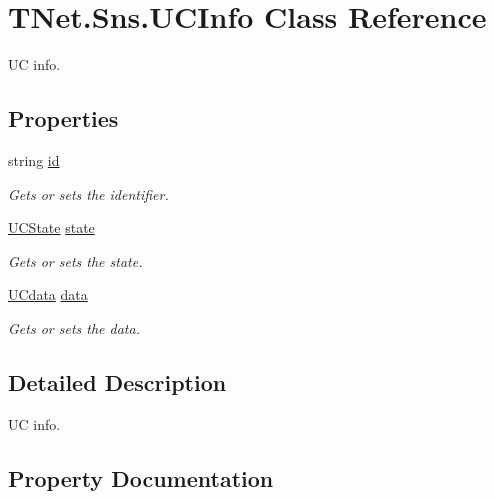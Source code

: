 \hypertarget{class_t_net_1_1_sns_1_1_u_c_info}{}\section{T\+Net.\+Sns.\+U\+C\+Info Class Reference}
\label{class_t_net_1_1_sns_1_1_u_c_info}


UC info.  


\subsection*{Properties}
\begin{DoxyCompactItemize}
\item 
string \mbox{\hyperlink{class_t_net_1_1_sns_1_1_u_c_info_a830b06eda6c267aacf0700dc9474a690}{id}}
\begin{DoxyCompactList}\small\item\em Gets or sets the identifier. \end{DoxyCompactList}\item 
\mbox{\hyperlink{class_t_net_1_1_sns_1_1_u_c_state}{U\+C\+State}} \mbox{\hyperlink{class_t_net_1_1_sns_1_1_u_c_info_a811c5e3ba364be5cee4498c1b291cc94}{state}}
\begin{DoxyCompactList}\small\item\em Gets or sets the state. \end{DoxyCompactList}\item 
\mbox{\hyperlink{class_t_net_1_1_sns_1_1_u_cdata}{U\+Cdata}} \mbox{\hyperlink{class_t_net_1_1_sns_1_1_u_c_info_af0a3636a2b9fbc6d32d46fb9281fdcdb}{data}}
\begin{DoxyCompactList}\small\item\em Gets or sets the data. \end{DoxyCompactList}\end{DoxyCompactItemize}


\subsection{Detailed Description}
UC info. 



\subsection{Property Documentation}
\mbox{\label{class_t_net_1_1_sns_1_1_u_c_info_af0a3636a2b9fbc6d32d46fb9281fdcdb}} 
